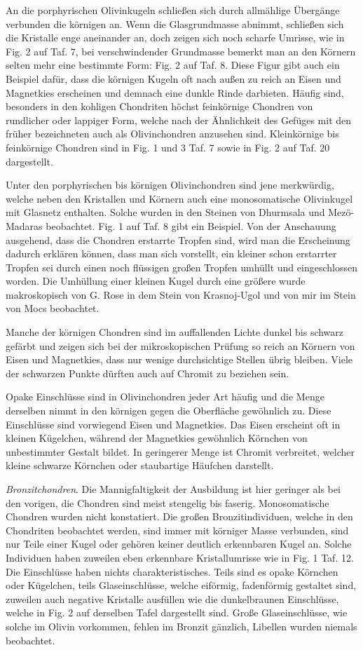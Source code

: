 \documentclass[a4paper, 11pt, oneside, polutonikogreek, german]{article}
\begin{document}
An die porphyrischen Olivinkugeln schließen sich durch allmählige Übergänge verbunden die körnigen an. Wenn die Glasgrundmasse abnimmt, schließen sich die Kristalle enge aneinander an, doch zeigen sich noch scharfe Umrisse, wie in Fig. 2 auf Taf. 7, bei verschwindender Grundmasse bemerkt man an den Körnern selten mehr eine bestimmte Form: Fig. 2 auf Taf. 8. Diese Figur gibt auch ein Beispiel dafür, dass die körnigen Kugeln oft nach außen zu reich an Eisen und Magnetkies erscheinen und demnach eine dunkle Rinde darbieten. Häufig sind, besonders in den kohligen Chondriten höchst feinkörnige Chondren von rundlicher oder lappiger Form, welche nach der Ähnlichkeit des Gefüges mit den früher bezeichneten auch als Olivinchondren anzusehen sind. Kleinkörnige bis feinkörnige Chondren sind in Fig. 1 und 3 Taf. 7 sowie in Fig. 2 auf Taf. 20 dargestellt.

Unter den porphyrischen bis körnigen Olivinchondren sind jene merkwürdig, welche neben den Kristallen und Körnern auch eine monosomatische Olivinkugel mit Glasnetz enthalten. Solche wurden in den Steinen von Dhurmsala und Mezö-Madaras beobachtet. Fig. 1 auf Taf. 8 gibt ein Beispiel. Von der Anschauung ausgehend, dass die Chondren erstarrte Tropfen sind, wird man die Erscheinung dadurch erklären können, dass man sich vorstellt, ein kleiner schon erstarrter Tropfen sei durch einen noch flüssigen großen Tropfen umhüllt und eingeschlossen worden. Die Umhüllung einer kleinen Kugel durch eine größere wurde makroskopisch von G. Rose in dem Stein von Krasnoj-Ugol und von mir im Stein von Mocs beobachtet.

Manche der körnigen Chondren sind im auffallenden Lichte dunkel bis schwarz gefärbt und zeigen sich bei der mikroskopischen Prüfung so reich an Körnern von Eisen und Magnetkies, dass nur wenige durchsichtige Stellen übrig bleiben. Viele der schwarzen Punkte dürften auch auf Chromit zu beziehen sein.

Opake Einschlüsse sind in Olivinchondren jeder Art häufig und die Menge derselben nimmt in den körnigen gegen die Oberfläche gewöhnlich zu. Diese Einschlüsse sind vorwiegend Eisen und Magnetkies. Das Eisen erscheint oft in kleinen Kügelchen, während der Magnetkies gewöhnlich Körnchen von unbestimmter Gestalt bildet. In geringerer Menge ist Chromit verbreitet, welcher kleine schwarze Körnchen oder staubartige Häufchen darstellt.

\emph{Bronzitchondren}. Die Mannigfaltigkeit der Ausbildung ist hier geringer als bei den vorigen, die Chondren sind meist stengelig bis faserig. Monosomatische Chondren wurden nicht konstatiert. Die großen Bronzitindividuen, welche in den Chondriten beobachtet werden, sind immer mit körniger Masse verbunden, sind nur Teile einer Kugel oder gehören keiner deutlich erkennbaren Kugel an. Solche Individuen haben zuweilen eben erkennbare Kristallumrisse wie in Fig. 1 Taf. 12. Die Einschlüsse haben nichts charakteristisches. Teils sind es opake Körnchen oder Kügelchen, teils Glaseinschlüsse, welche eiförmig, fadenförmig gestaltet sind, zuweilen auch negative Kristalle ausfüllen wie die dunkelbraunen Einschlüsse, welche in Fig. 2 auf derselben Tafel dargestellt sind. Große Glaseinschlüsse, wie solche im Olivin vorkommen, fehlen im Bronzit gänzlich, Libellen wurden niemals beobachtet.
\end{document}
